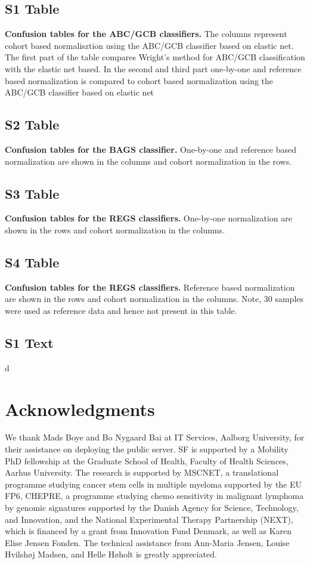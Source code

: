 \documentclass[10pt,letterpaper]{article}
\begin{document}
\subsection*{S1 Table}\label{tab:confusionABCGCBHEMA}
\textbf{Confusion tables for the ABC/GCB classifiers.}
The columns represent cohort based normalisztion using the ABC/GCB classifier
based on elastic net.
The first part of the table compares Wright's method for ABC/GCB classification
with the elastic net based.
In the second and third part one-by-one and reference based normalization is
compared to cohort based normalization using the ABC/GCB classifier based on
elastic net

\subsection*{S2 Table}\label{tab:BAGShemaclass}
\textbf{Confusion tables for the BAGS classifier.} One-by-one and reference
based normalization are shown in the columns and cohort normalization in the
rows.

\subsection*{S3 Table}\label{tab:confusiondrugonebyone}
\textbf{Confusion tables for the REGS classifiers.}
One-by-one normalization are shown in the rows and cohort normalization in the
columns.

\subsection*{S4 Table}\label{tab:confusiondrugreference}
\textbf{Confusion tables for the REGS classifiers.}
Reference based normalization are shown in the rows and cohort normalization in
the columns. Note, 30 samples were used as reference data and hence not present
in this table.

\subsection*{S1 Text}
\label{sec:graham}
d

\section*{Acknowledgments}
We thank Mads Boye and Bo Nygaard Bai at IT Services, Aalborg University, for their assistance on deploying the public server.
SF is supported by a Mobility PhD fellowship at the Graduate School of Health, Faculty of Health Sciences, Aarhus University.
The research is supported by MSCNET, a translational programme studying cancer stem cells in multiple myeloma supported by the EU FP6, CHEPRE, a programme studying chemo sensitivity in malignant lymphoma by genomic signatures supported by the Danish Agency for Science, Technology, and Innovation, and the National Experimental Therapy Partnership (NEXT), which is financed by a grant from Innovation Fund Denmark, as well as Karen Elise Jensen Fonden.
The technical assistance from Ann-Maria Jensen, Louise Hvilsh{\o}j Madsen, and Helle H{\o}holt is greatly appreciated.
\end{document}
